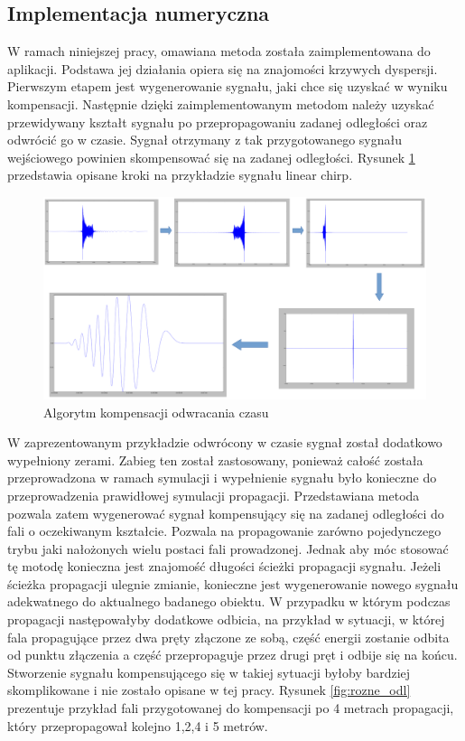 \subsection{Implementacja numeryczna}
W ramach niniejszej pracy, omawiana metoda została zaimplementowana do aplikacji. Podstawa jej działania opiera się na znajomości krzywych dyspersji. Pierwszym etapem jest wygenerowanie sygnału, jaki chce się uzyskać w wyniku kompensacji. Następnie dzięki zaimplementowanym metodom należy uzyskać przewidywany kształt sygnału po przepropagowaniu zadanej odległości oraz odwrócić go w czasie. Sygnał otrzymany z tak przygotowanego sygnału wejściowego powinien skompensować się na zadanej odległości. Rysunek \ref{fig:kolejne_etapy_TR} przedstawia opisane kroki na przykładzie sygnału linear chirp.
\begin{figure}[h]
\centering
\includegraphics[width=14cm]{Zdjecia/4/algorytm_komp_tr}
\caption{Algorytm kompensacji odwracania czasu}
\label{fig:kolejne_etapy_TR}
\end{figure}

W zaprezentowanym przykładzie odwrócony w czasie sygnał został dodatkowo wypełniony zerami. Zabieg ten został zastosowany, ponieważ całość została przeprowadzona w ramach symulacji i wypełnienie sygnału było konieczne do przeprowadzenia prawidłowej symulacji propagacji. Przedstawiana metoda pozwala zatem wygenerować sygnał kompensujący się na zadanej odległości do fali o oczekiwanym kształcie. Pozwala na propagowanie zarówno pojedynczego trybu jaki nałożonych wielu postaci fali prowadzonej. Jednak aby móc stosować tę motodę konieczna jest znajomość długości ścieżki propagacji sygnału. Jeżeli ścieżka propagacji ulegnie zmianie, konieczne jest wygenerowanie nowego sygnału adekwatnego do aktualnego badanego obiektu. W przypadku w którym podczas propagacji następowałyby dodatkowe odbicia, na przykład w sytuacji, w której fala propagujące przez dwa pręty złączone ze sobą, część energii zostanie odbita od punktu złączenia a część przepropaguje przez drugi pręt i odbije się na końcu. Stworzenie sygnału kompensującego się w takiej sytuacji byłoby bardziej skomplikowane i nie zostało opisane w tej pracy. Rysunek \ref{fig:rozne_odl} prezentuje przykład fali przygotowanej do kompensacji po 4 metrach propagacji, który przepropagował kolejno 1,2,4 i 5 metrów.

